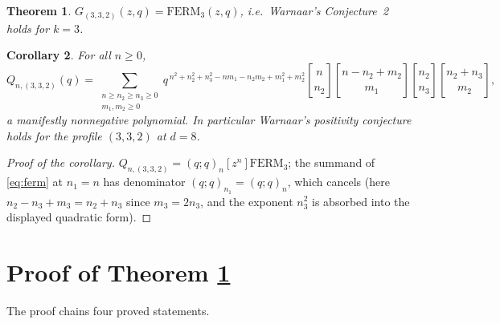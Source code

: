 \documentclass[11pt]{article}
\newtheorem{theorem}{Theorem}
\newtheorem{corollary}[theorem]{Corollary}
\newcommand{\qbin}[2]{\genfrac{[}{]}{0pt}{}{#1}{#2}}
\newcommand{\poch}[1]{(q;q)_{#1}}
\begin{document}
\begin{theorem}\label{thm:main}
$G_{(3,3,2)}(z,q)=\mathrm{FERM}_3(z,q)$, i.e.\ Warnaar's Conjecture~2 holds
for $k=3$.
\end{theorem}

\begin{corollary}\label{cor:pos}
For all $n\ge 0$,
\[
Q_{n,(3,3,2)}(q)=
\sum_{\substack{n\ge n_2\ge n_3\ge 0\\ m_1,m_2\ge 0}}
q^{\,n^2+n_2^2+n_3^2-nm_1-n_2m_2+m_1^2+m_2^2}
\qbin{n}{n_2}\qbin{n-n_2+m_2}{m_1}\qbin{n_2}{n_3}\qbin{n_2+n_3}{m_2},
\]
a manifestly nonnegative polynomial. In particular Warnaar's positivity
conjecture holds for the profile $(3,3,2)$ at $d=8$.
\end{corollary}

\begin{proof}[Proof of the corollary]
$Q_{n,(3,3,2)}=\poch{n}[z^n]\mathrm{FERM}_3$; the summand of \eqref{eq:ferm}
at $n_1=n$ has denominator $\poch{n_1}=\poch{n}$, which cancels
(here $n_2-n_3+m_3=n_2+n_3$ since $m_3=2n_3$, and the exponent
$n_3^2$ is absorbed into the displayed quadratic form).
\end{proof}

\section{Proof of Theorem \ref{thm:main}}

The proof chains four proved statements.
\end{document}
